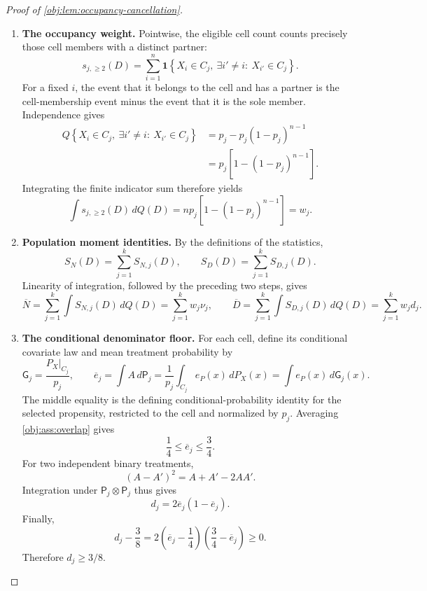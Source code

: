 \begin{proof}[Proof of \cref{obj:lem:occupancy-cancellation}]
\begin{enumerate}
\item \textbf{The occupancy weight.}
Pointwise, the eligible cell count counts precisely those cell members with a distinct partner:
\[
s_{j,\ge2}(D)
=
\sum_{i=1}^n
\mathbf1\left\{
X_i\in C_j,\ 
\exists i'\ne i:\ X_{i'}\in C_j
\right\}.
\]
For a fixed \(i\), the event that it belongs to the cell and has a partner is the cell-membership event minus the event that it is the sole member. Independence gives
\[
\begin{aligned}
Q\left\{X_i\in C_j,\ 
 \exists i'\ne i:\ X_{i'}\in C_j\right\}
&=
p_j-p_j(1-p_j)^{n-1}\\
&=p_j\left[1-(1-p_j)^{n-1}\right].
\end{aligned}
\]
Integrating the finite indicator sum therefore yields
\[
\int s_{j,\ge2}(D)\,dQ(D)
=
np_j\left[1-(1-p_j)^{n-1}\right]
=w_j.
\]

\item \textbf{Population moment identities.}
By the definitions of the statistics,
\[
S_N(D)=\sum_{j=1}^k S_{N,j}(D),
\qquad
S_D(D)=\sum_{j=1}^k S_{D,j}(D).
\]
Linearity of integration, followed by the preceding two steps, gives
\[
\overline N
=\sum_{j=1}^k\int S_{N,j}(D)\,dQ(D)
=\sum_{j=1}^k w_j\nu_j,
\qquad
\overline D
=\sum_{j=1}^k\int S_{D,j}(D)\,dQ(D)
=\sum_{j=1}^k w_jd_j.
\]

\item \textbf{The conditional denominator floor.}
For each cell, define its conditional covariate law and mean treatment probability by
\[
\mathsf G_j=\frac{P_X|_{C_j}}{p_j},
\qquad
\overline e_j
=\int A\,d\mathsf P_j
=\frac{1}{p_j}\int_{C_j}e_P(x)\,dP_X(x)
=\int e_P(x)\,d\mathsf G_j(x).
\]
The middle equality is the defining conditional-probability identity for the selected propensity, restricted to the cell and normalized by \(p_j\). Averaging \cref{obj:ass:overlap} gives
\[
\frac14\le\overline e_j\le\frac34.
\]
For two independent binary treatments,
\[
(A-A')^2=A+A'-2AA'.
\]
Integration under \(\mathsf P_j\otimes\mathsf P_j\) thus gives
\[
d_j=2\overline e_j(1-\overline e_j).
\]
Finally,
\[
d_j-\frac38
=
2\left(\overline e_j-\frac14\right)
 \left(\frac34-\overline e_j\right)\ge0.
\]
Therefore \(d_j\ge3/8\).


\end{enumerate}
\end{proof}
